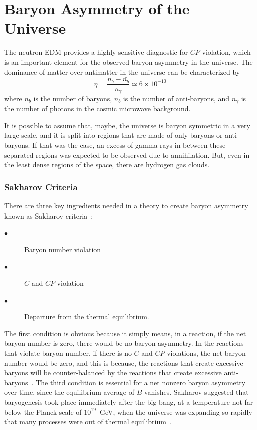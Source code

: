 \section{Baryon Asymmetry of the Universe}
The neutron EDM provides a highly sensitive diagnostic for $CP$
violation, which is an important element for the observed
baryon asymmetry in the universe. The dominance of matter over
antimatter in the universe can be characterized by~\cite{Cline}
\begin{equation}
\eta = \frac{n_b-\bar{n_b}}{n_{\gamma}} \simeq 6 \times 10^{-10}
\end{equation}
where $n_b$ is the number of baryons, $\bar{n_b}$ is the number of
anti-baryons, and $n_{\gamma}$ is the number of photons in the cosmic
microwave background.

It is possible to assume that, maybe, the universe is baryon symmetric
in a very large scale, and it is split into regions that are made of
only baryons or anti-baryons. If that was the case, an excess of gamma
rays in between these separated regions was expected to be observed
due to annihilation. But, even in the least dense regions of the
space, there are hydrogen gas clouds.

\subsubsection{Sakharov Criteria}
There are three key ingredients needed in a theory to create baryon
asymmetry known as Sakharov criteria~\cite{Sakharov:1967dj}:
\begin{center}
\begin{description}
\item[$\bullet$]Baryon number violation
\item[$\bullet$] $C$ and $CP$ violation
\item[$\bullet$] Departure from the thermal equilibrium.
\end{description}
\end{center}

The first condition is obvious because it simply means, in a reaction,
if the net baryon number is zero, there would be no baryon
asymmetry. In the reactions that violate baryon number, if there is no
$C$ and $CP$ violations, the net baryon number would be zero, and this
is because, the reactions that create excessive baryons will be
counter-balanced by the reactions that create excessive
anti-baryons~\cite{theearlyuniverse}. The third condition is essential
for a net nonzero baryon asymmetry over time, since the equilibrium
average of $B$ vanishes. Sakharov suggested that baryogenesis took
place immediately after the big bang, at a temperature not far below
the Planck scale of $10^{19}$~GeV, when the universe was expanding so
rapidly that many processes were out of thermal
equilibrium~\cite{cohen1993progress}.

